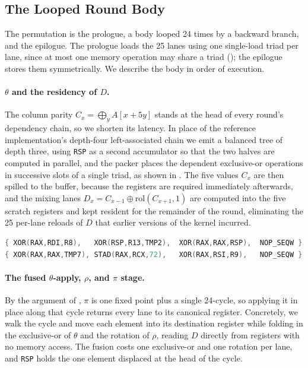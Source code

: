 \subsection{The Looped Round Body}
\label{sec:keccak-round}

The permutation is the prologue, a body looped 24 times by a backward branch,
and the epilogue. The prologue loads the 25 lanes using one single-load triad
per lane, since at most one memory operation may share a triad
(); the epilogue stores them symmetrically. We
describe the body in order of execution.

\paragraph{$\theta$ and the residency of $D$.}
The column parity $C_x=\bigoplus_y A[x{+}5y]$ stands at the head of every
round's dependency chain, so we shorten its latency. In place of the reference
implementation's depth-four left-associated chain we emit a balanced tree of
depth three, using \texttt{RSP} as a second accumulator so that the two halves
are computed in parallel, and the packer places the dependent exclusive-or
operations in successive slots of a single triad, as shown in
. The five values $C_x$ are then spilled to the buffer,
because the registers are required immediately afterwards, and the mixing lanes
$D_x = C_{x-1}\oplus \mathrm{rol}(C_{x+1},1)$ are computed into the five scratch
registers and kept resident for the remainder of the round, eliminating the 25
per-lane reloads of $D$ that earlier versions of the kernel incurred.

\begin{lstlisting}[language=C,caption={The depth-three parity tree of $\theta$,
in which a single column's tree is packed into the slots of one triad while the
spill of the previous column is interleaved.},label={lst:keccak-theta},basicstyle=\ttfamily\footnotesize]
{ XOR(RAX,RDI,R8),   XOR(RSP,R13,TMP2),  XOR(RAX,RAX,RSP),  NOP_SEQW }
{ XOR(RAX,RAX,TMP7), STAD(RAX,RCX,72),   XOR(RAX,RSI,R9),   NOP_SEQW }
\end{lstlisting}

\paragraph{The fused $\theta$-apply, $\rho$, and $\pi$ stage.}
By the argument of , $\pi$ is one fixed point plus a
single 24-cycle, so applying it in place along that cycle returns every lane to
its canonical register. Concretely, we walk the cycle and move each element into
its destination register while folding in the exclusive-or of $\theta$ and the
rotation of $\rho$, reading $D$ directly from registers with no memory access.
The fusion costs one exclusive-or and one rotation per lane, and \texttt{RSP}
holds the one element displaced at the head of the cycle.

